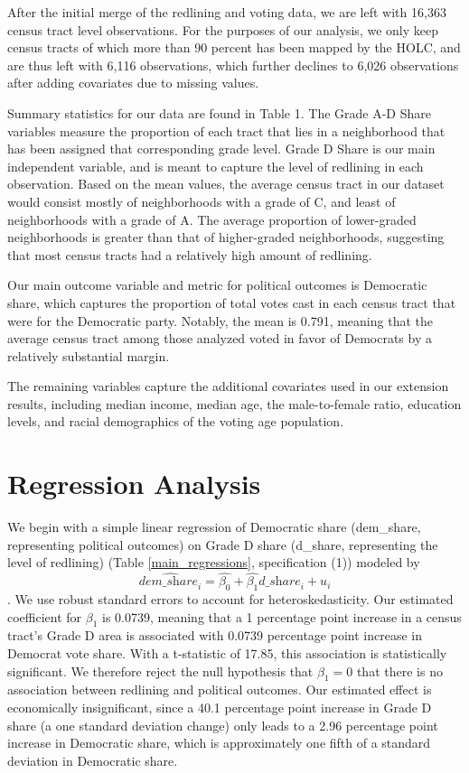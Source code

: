 \documentclass{eco_375_paper}
\begin{document}
After the initial merge of the redlining and voting data, we are left with 16,363 census tract level observations. For the purposes of our analysis, we only keep census tracts of which more than 90 percent has been mapped by the HOLC, and are thus left with 6,116 observations, which further declines to 6,026 observations after adding covariates due to missing values.

Summary statistics for our data are found in Table 1. The Grade A-D Share variables measure the proportion of each tract that lies in a neighborhood that has been assigned that corresponding grade level. Grade D Share is our main independent variable, and is meant to capture the level of redlining in each observation. Based on the mean values, the average census tract in our dataset would consist mostly of neighborhoods with a grade of C, and least of neighborhoods with a grade of A. The average proportion of lower-graded neighborhoods is greater than that of higher-graded neighborhoods, suggesting that most census tracts had a relatively high amount of redlining.

Our main outcome variable and metric for political outcomes is Democratic share, which captures the proportion of total votes cast in each census tract that were for the Democratic party. Notably, the mean is 0.791, meaning that the average census tract among those analyzed voted in favor of Democrats by a relatively substantial margin.

The remaining variables capture the additional covariates used in our extension results, including median income, median age, the male-to-female ratio, education levels, and racial demographics of the voting age population. 


\section*{Regression Analysis}
We begin with a simple linear regression of Democratic share (dem\_share, representing political outcomes) on Grade D share (d\_share, representing the level of redlining) (Table \ref{main_regressions}, specification (1)) modeled by $$\hat{\textit{dem\_share}_i} = \hat{\beta_0} + \hat{\beta_1}{\textit{d\_share}_i} + u_i$$. We use robust standard errors to account for heteroskedasticity. Our estimated coefficient for $\beta_1$ is 0.0739, meaning that a 1 percentage point increase in a census tract’s Grade D area is associated with 0.0739 percentage point increase in Democrat vote share. With a t-statistic of 17.85, this association is statistically significant. We therefore reject the null hypothesis that $\beta_1 = 0$ that there is no association between redlining and political outcomes. Our estimated effect is economically insignificant, since a 40.1 percentage point increase in Grade D share (a one standard deviation change) only leads to a 2.96 percentage point increase in Democratic share, which is approximately one fifth of a standard deviation in Democratic share.
\end{document}

